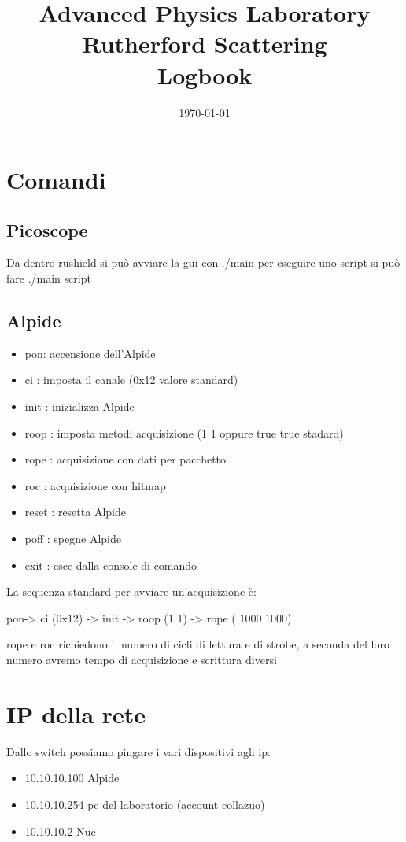 \documentclass[a4paper]{article}
\title{\textbf{\huge Advanced Physics Laboratory}\\\textbf{\huge Rutherford Scattering}\\Logbook}
\date{\today}
\begin{document}
\maketitle
\vspace{1cm}


\section{Comandi}
\subsection{Picoscope}
Da dentro rushield si può avviare la gui con ./main per eseguire uno script si può fare ./main script



\subsection{Alpide}

\begin{itemize}
	\item pon: accensione dell'Alpide
	\item ci : imposta il canale (0x12 valore standard)
	\item init : inizializza Alpide
	\item roop : imposta metodi acquisizione (1 1 oppure true true stadard)
	\item rope : acquisizione con dati per pacchetto
	\item roc : acquisizione con hitmap
	\item reset : resetta Alpide
	\item poff : spegne Alpide
	\item exit : esce dalla console di comando
\end{itemize}

La sequenza standard per avviare un'acquisizione è:

pon-> ci (0x12) -> init -> roop (1 1) -> rope ( 1000 1000)

rope e roc richiedono il numero di cicli di lettura e di strobe, a seconda del loro numero avremo tempo di acquisizione e scrittura diversi

\section{IP della rete}

Dallo switch possiamo pingare i vari dispositivi agli ip:
\begin{itemize}
	\item 10.10.10.100 Alpide
	\item 10.10.10.254 pc del laboratorio (account collazuo)
	\item 10.10.10.2  Nuc
\end{itemize}
\end{document}
